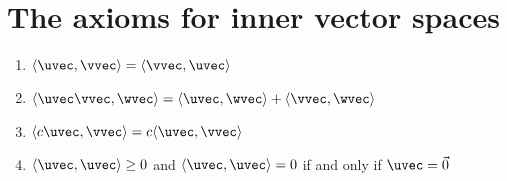 \section{The axioms for inner vector spaces}

\begin{enumerate}
 \item $\langle \uvec, \vvec \rangle = \langle \vvec, \uvec \rangle$
 \item $\langle \uvec \vvec, \wvec \rangle = \langle \uvec, \wvec \rangle + \langle \vvec, \wvec \rangle$
 \item $\langle c\uvec, \vvec \rangle = c\langle \uvec, \vvec \rangle$
 \item $\langle \uvec, \uvec \rangle \geq 0$ and $\langle \uvec, \uvec \rangle = 0$ if and only if $\uvec = \vec{0}$
\end{enumerate}


